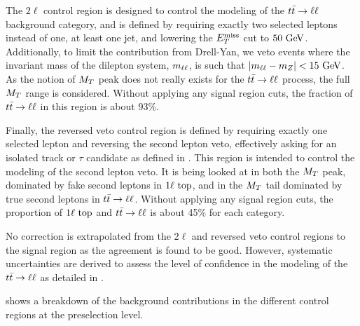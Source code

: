     The $2\ell$ control region is designed to control the modeling of the $t\bar{t} \rightarrow \ell \ell$
    background category, and is defined by requiring exactly two selected leptons instead
    of one, at least one jet, and lowering the $E_T^\text{miss}$ cut to $50 ~\text{GeV}$. Additionally, to
    limit the contribution from Drell-Yan, we veto events where the invariant mass of the dilepton
    system, $m_{\ell\ell}$, is such that $\left|m_{\ell\ell} - m_{Z}\right| < 15 ~\text{GeV}$.
    As the notion of $M_T$ peak does not really exists for the $t\bar{t} \rightarrow \ell \ell$ process,
    the full $M_T$ range is considered. Without applying any signal region cuts, the
    fraction of $t\bar{t} \rightarrow \ell \ell$ in this region is about 93\%.

    Finally, the reversed veto control region is defined by requiring exactly one selected
    lepton and reversing the second lepton veto, effectively asking for an isolated track
    or $\tau$ candidate as defined in . This region is intended to control
    the modeling of the second lepton veto. It is being looked at in both the $M_T$ peak,
    dominated by fake second leptons in $1\ell~\text{top}$, and in the $M_T$ tail dominated
    by true second leptons in $t\bar{t} \rightarrow \ell \ell$. Without applying any signal region cuts,
    the proportion of $1\ell~\text{top}$ and $t\bar{t} \rightarrow \ell \ell$ is about 45\% for each category.

    No correction is extrapolated from the $2\ell$ and reversed veto control regions
    to the signal region as the agreement is found to be good. However, systematic uncertainties
    are derived to assess the level of confidence in the modeling of the $t\bar{t} \rightarrow \ell \ell$ as
    detailed in .

     shows a breakdown of the background contributions
    in the different control regions at the preselection level.

